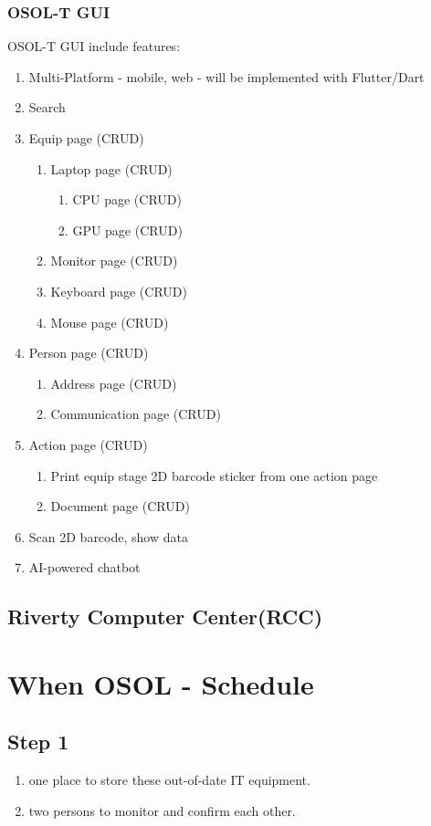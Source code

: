 \documentclass[a4paper,11pt]{article}
\begin{document}
\subsubsection{OSOL-T GUI}
OSOL-T GUI include features:
\begin{enumerate}
	\item Multi-Platform - mobile, web - will be implemented with Flutter/Dart
	\item Search
	\item Equip page (CRUD)
	\begin{enumerate}
		\item Laptop page (CRUD)
		\begin{enumerate}
			\item CPU page (CRUD)
			\item GPU page (CRUD)
		\end{enumerate}
		\item Monitor page (CRUD)
		\item Keyboard page (CRUD)
		\item Mouse page (CRUD)
	\end{enumerate}
	\item Person page (CRUD)
	\begin{enumerate}
		\item Address page (CRUD)
		\item Communication page (CRUD) 
	\end{enumerate}
	\item Action page (CRUD)
	\begin{enumerate}
		\item Print equip stage 2D barcode sticker from one action page
		\item Document page (CRUD)
	\end{enumerate}
	\item Scan 2D barcode, show data
	\item AI-powered chatbot
\end{enumerate}



\subsection{Riverty Computer Center(RCC)}


\section{When OSOL - Schedule}
\subsection{Step 1}
\begin{enumerate}
\item one place to store these out-of-date IT equipment.
\item two persons to monitor and confirm each other.
\end{enumerate}
\end{document}
